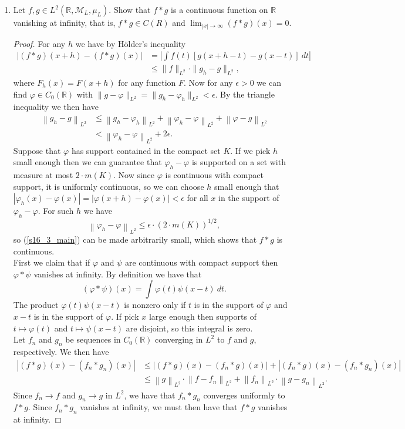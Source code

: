 \documentclass[11pt,letterpaper]{report}
\newcommand{\reals}{\mathbb{R}}
\newcommand{\mcal}[1]{\mathcal{#1}}
\newcommand{\Lp}[2]{\left\|{#1}\right\|_{L^{#2}}}
\begin{document}
\begin{enumerate}
	\item Let $f,g\in L^2(\reals, \mcal{M}_L, \mu_L)$. Show that $f*g$ is a continuous function on $\reals$ vanishing at infinity, that is, $f*g\in C(R)$ and $\lim_{|x|\to \infty}(f*g)(x) = 0$.
	\begin{proof}
		For any $h$ we have by H\"older's inequality
		\begin{align}\label{s16_3_main}
			|(f*g)(x+h)-(f*g)(x)| &= \left|\int f(t)[g(x+h-t) - g(x-t)]\ dt\right|\\
			&\leq \|f\|_{L^2}\cdot \|g_h-g\|_{L^2},
		\end{align}
		where $F_h(x) = F(x+h)$ for any function $F$. Now for any $\epsilon>0$ we can find $\varphi\in C_0(\reals)$ with $\|g-\varphi\|_{L^2} = \|g_h-\varphi_h\|_{L^2} <\epsilon$. By the triangle inequality we then have
		\begin{align*}
		\Lp{g_h-g}{2} &\leq \Lp{g_h-\varphi_h}{2} + \Lp{\varphi_h-\varphi}{2} +\Lp{\varphi-g}{2}\\
		&< \Lp{\varphi_h-\varphi}{2} + 2\epsilon.
		\end{align*}
		Suppose that $\varphi$ has support contained in the compact set $K$. If we pick $h$ small enough then we can guarantee that $\varphi_h-\varphi$ is supported on a set with measure at most $2\cdot m(K)$. Now since $\varphi$ is continuous with compact support, it is uniformly continuous, so we can choose $h$ small enough that $|\varphi_h(x)-\varphi(x)| = |\varphi(x+h)-\varphi(x)|<\epsilon$ for all $x$ in the support of $\varphi_h-\varphi$. For such $h$ we have
		\[
		\Lp{\varphi_h-\varphi}{2} \leq \epsilon \cdot (2\cdot m(K))^{1/2},
		\]
		so (\ref{s16_3_main}) can be made arbitrarily small, which shows that $f*g$ is continuous.\\

		\noindent First we claim that if $\varphi$ and $\psi$ are continuous with compact support then $\varphi*\psi$ vanishes at infinity. By definition we have that
		\[
		(\varphi*\psi)(x) = \int\varphi(t)\psi(x-t)\ dt.
		\]
		The product $\varphi(t)\psi(x-t)$ is nonzero only if $t$ is in the support of $\varphi$ and $x-t$ is in the support of $\varphi$. If pick $x$ large enough then supports of $t\mapsto \varphi(t)$ and $t\mapsto \psi(x-t)$ are disjoint, so this integral is zero.\\

		\noindent Let $f_n$ and $g_n$ be sequences in $C_0(\reals)$ converging in $L^2$ to $f$ and $g$, respectively. We then have
		\begin{align*}
			|(f*g)(x)-(f_n*g_n)(x)| &\leq |(f*g)(x)-(f_n*g)(x)| + |(f_n*g)(x)-(f_n*g_n)(x)|\\
			&\leq \Lp{g}{2}\cdot \Lp{f-f_n}{2} + \Lp{f_n}{2}\cdot \Lp{g-g_n}{2}.
		\end{align*}
		Since $f_n\to f$ and $g_n\to g$ in $L^2$, we have that $f_n*g_n$ converges uniformly to $f*g$. Since $f_n*g_n$ vanishes at infinity, we must then have that $f*g$ vanishes at infinity.
	\end{proof}


\end{enumerate}
\end{document}
